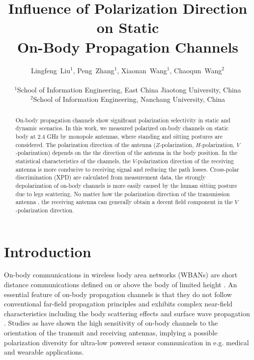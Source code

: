 \documentclass[conference]{IEEEtran}
\begin{document}
\title{Influence of Polarization Direction on Static \\ On-Body Propagation Channels}
\author{Lingfeng~Liu$^1$, Peng~Zhang$^1$, Xiaonan~Wang$^1$, Chaoqun~Wang$^2$\\
\\
$^1$School of Information Engineering, East China Jiaotong University, China \\
$^2$School of Information Engineering,  Nanchang University, China}

\maketitle
\begin{abstract}
On-body propagation channels show significant polarization selectivity in static and dynamic scenarios. In this work, we measured polarized on-body channels on static body at 2.4 GHz by monopole antennas, where standing and sitting postures are considered. The polarization direction of the antenna ($Z$-polarization, $H$-polarization, $V$-polarization) depends on the the direction of the antenna in the body position. In the statistical characteristics of the channels, the $V$-polarization direction of the receiving antenna is more conducive to receiving signal and reducing the path losses. Cross-polar discrimination (XPD) are calculated from measurement data, the strongly depolarization of on-body channels is more easily caused by the human sitting posture due to legs scattering. No matter how the polarization direction of the transmission antenna , the receiving antenna can generally obtain a decent field component in the $V$-polarization direction.
\end{abstract}

\section{Introduction}
On-body communications in wireless body area networks (WBANs) are short distance communications defined on or above the body of limited height \cite{1}. An essential feature of on-body propagation channels is that they do not follow conventional far-field propagation principles and exhibits complex near-field characteristics including the body scattering effects\cite{2,3} and surface wave propagation \cite{5}. Studies as \cite{6} have shown the high sensitivity of on-body channels to the orientation of the transmit and receiving antennas, implying a possible polarization diversity for ultra-low powered sensor communication in e.g. medical and wearable applications.
\end{document}
